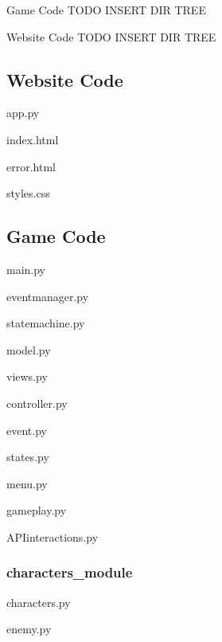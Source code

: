 \documentclass[a4paper, 11pt]{report}
\begin{document}
\large{Game Code}
TODO INSERT DIR TREE


\large{Website Code}
TODO INSERT DIR TREE

\lstlistoflistings
\subsection{Website Code}

app.py


index.html


error.html


styles.css



\subsection{Game Code}

main.py


eventmanager.py


statemachine.py


model.py


views.py


controller.py


event.py


states.py


menu.py


gameplay.py


APIinteractions.py


\subsubsection{characters\_module}
characters.py

enemy.py

\end{document}
